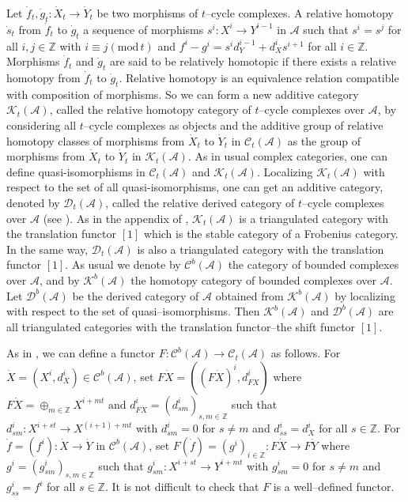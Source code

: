 \documentclass{amsart}
\theoremstyle{definition}
\numberwithin{equation}{section}
\begin{document}
Let $\dot{f}_t, \dot{g}_t: \dot{X}_t \longrightarrow \dot{Y}_t$ be
two morphisms of $t$--cycle complexes. A relative homotopy
$\dot{s}_t$ from $\dot{f}_t$ to $\dot{g}_t$ a sequence of morphisms
$s^i: X^i \longrightarrow Y^{i-1}$ in $\mathcal{A}$ such that
$s^i=s^j$ for all $i, j \in \mathbb{Z}$ with $i \equiv j ({{\text{mod}}}
\,t)$ and $f^i-g^i=s^i d_Y^{i-1}+d_X^i s^{i+1}$ for all $i\in
\mathbb{Z}$. Morphisms $\dot{f}_t$ and $\dot{g}_t$ are said to be
relatively homotopic if there exists a relative homotopy from
$\dot{f}_t$ to $\dot{g}_t$. Relative homotopy is an equivalence
relation compatible with composition of morphisms. So we can form a
new additive category $\mathcal{K}_t (\mathcal{A})$, called the
relative homotopy category of $t$--cycle complexes over
$\mathcal{A}$, by considering all $t$--cycle complexes as objects
and the additive group of relative homotopy classes of morphisms
from $\dot{X}_t$ to $\dot{Y}_t$ in $\mathcal{C}_t(\mathcal{A})$ as
the group of morphisms from $\dot{X}_t$ to $\dot{Y}_t$ in
$\mathcal{K}_t(\mathcal{A})$. As in usual complex categories, one
can define quasi-isomorphisms in $\mathcal{C}_t(\mathcal{A})$ and
$\mathcal{K}_t(\mathcal{A})$. Localizing $\mathcal{K}_t
(\mathcal{A})$ with respect to the set of all quasi-isomorphisms,
one can get an additive category, denoted by $\mathcal{D}_t
(\mathcal{A})$, called the relative derived category of $t$--cycle
complexes over $\mathcal{A}$ (see \cite[Section 3.2]{LP}). As in the
appendix of \cite{PX1997}, $\mathcal{K}_t(\mathcal{A})$ is a
triangulated category with the translation functor $[1]$ which is
the stable category of a Frobenius category. In the same way,
${{\mathcal{D}}}_t(\mathcal{A})$ is also a triangulated category with the
translation functor $[1]$. As usual we denote by
$\mathcal{C}^b(\mathcal{A})$ the  category of bounded complexes over
$\mathcal{A}$, and by $\mathcal{K}^b(\mathcal{A})$  the homotopy
category of bounded complexes over $\mathcal{A}$. Let
$\mathcal{D}^b(\mathcal{A})$ be the derived category of
$\mathcal{A}$ obtained from $\mathcal{K}^b(\mathcal{A})$  by
localizing with respect to the set of quasi--isomorphisms. Then
$\mathcal{K}^b(\mathcal{A})$ and $\mathcal{D}^b(\mathcal{A})$ are
all triangulated categories with the translation functor--the shift
functor $[1]$.

As in \cite{PX1997}, we can define a functor $F:
\mathcal{C}^b(\mathcal{A}) \longrightarrow
\mathcal{C}_t(\mathcal{A})$ as follows. For $\dot{X}=(X^i, d_X^i)
\in \mathcal{C}^b(\mathcal{A})$, set $F\dot{X}=((F\dot{X})^i,
d_{F\dot{X}}^i)$ where $F\dot{X}=\oplus_{m\in \mathbb{Z}}X^{i+mt}
\text{ and } d_{F\dot{X}}^i=(d_{sm}^i)_{s,m\in \mathbb{Z}}$ such
that $d_{sm}^i: X^{i+st}\longrightarrow X^{(i+1)+mt}$ with
$d_{sm}^i=0$ for $s\neq m$ and $d_{ss}^i=d_X^i$ for all $s\in
\mathbb{Z}$. For $\dot{f}=(f^i):\dot{X} \longrightarrow \dot{Y}$ in
$\mathcal{C}^b(\mathcal{A})$, set $F(\dot{f})=(g^i)_{i\in
\mathbb{Z}}: F\dot{X} \longrightarrow F\dot{Y}$ where
$g^i=(g_{sm}^i)_{s,m\in\mathbb{Z}}$ such that $g_{sm}^i: X^{i+st}
\longrightarrow Y^{i+mt}$ with $g_{sm}^i=0$ for $s\neq m$ and
$g_{ss}^i=f^i$ for all $s\in \mathbb{Z}$. It is not difficult to
check that $F$ is a well--defined functor.
\end{document}
